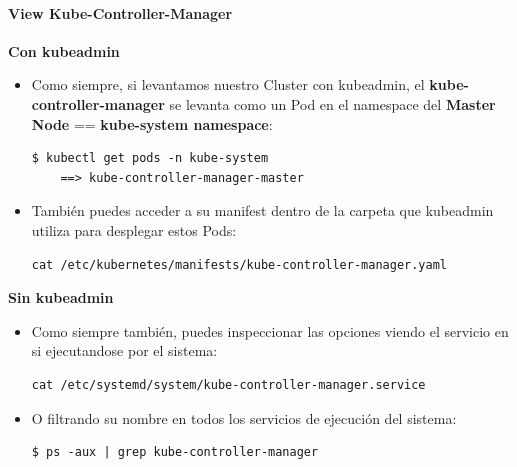 \documentclass{article}
\newenvironment{codetemplate}[1][]{%
  \mybasecolorbox[#1]
  \itshape
}{%
  \endmybasecolorbox
}
\begin{document}
\paragraph{View Kube-Controller-Manager}

\textbf{Con kubeadmin}

\begin{itemize}
    \item Como siempre, si levantamos nuestro Cluster con kubeadmin, el \textbf{kube-controller-manager} se levanta como un Pod en el namespace del \textbf{Master Node} == \textbf{kube-system namespace}:
\begin{codetemplate}{}
\begin{verbatim}
$ kubectl get pods -n kube-system
    ==> kube-controller-manager-master
\end{verbatim}
\end{codetemplate}

    \item También puedes acceder a su manifest dentro de la carpeta que kubeadmin utiliza para desplegar estos Pods:
\begin{codetemplate}{}
\begin{verbatim}
cat /etc/kubernetes/manifests/kube-controller-manager.yaml
\end{verbatim}
\end{codetemplate}
\end{itemize}

\textbf{Sin kubeadmin}

\begin{itemize}
    \item Como siempre también, puedes inspeccionar las opciones viendo el servicio en si ejecutandose por el sistema:
\begin{codetemplate}{}
\begin{verbatim}
cat /etc/systemd/system/kube-controller-manager.service
\end{verbatim}
\end{codetemplate}

    \item O filtrando su nombre en todos los servicios de ejecución del sistema:
\begin{codetemplate}{}
\begin{verbatim}
$ ps -aux | grep kube-controller-manager
\end{verbatim}
\end{codetemplate}
\end{itemize}
\end{document}
